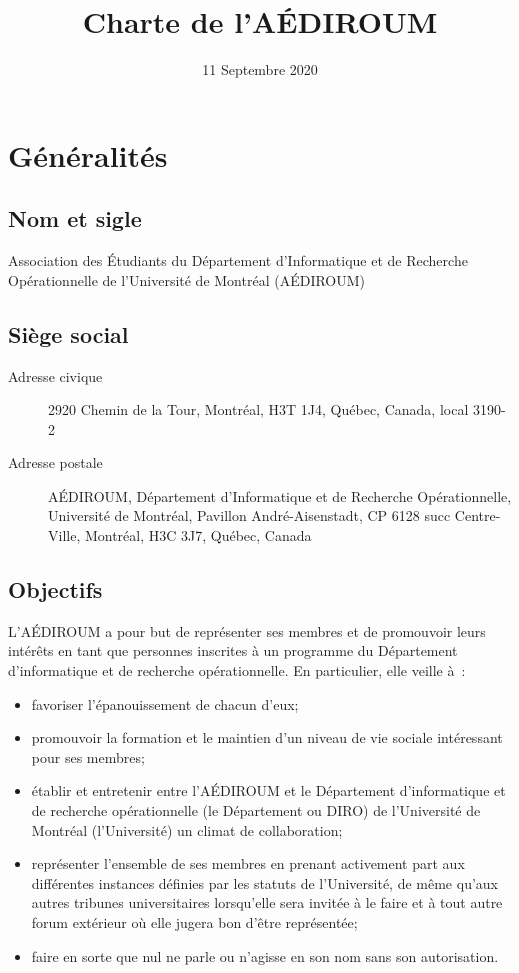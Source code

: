 \documentclass{aediroum}
\title{Charte de l'AÉDIROUM}
\date{11 Septembre 2020}
\begin{document}
\maketitle

\section{Généralités}\label{sec:generalites}

\subsection{Nom et sigle}\label{sec:nom-et-sigle}
Association des Étudiants du Département d'Informatique et de Recherche Opérationnelle de l'Université de Montréal (AÉDIROUM)

\subsection{Siège social}\label{sec:siege-social}
  \begin{description}
  \item[Adresse civique] 2920 Chemin de la Tour, Montréal, H3T 1J4, Québec, Canada, local 3190-2
  \item[Adresse postale] AÉDIROUM, Département d'Informatique et de Recherche Opérationnelle, Université de Montréal, Pavillon André-Aisenstadt, CP 6128 succ Centre-Ville, Montréal, H3C 3J7, Québec, Canada
  \end{description}

\subsection{Objectifs}\label{sec:objectifs}

L'AÉDIROUM a pour but de représenter ses membres et de promouvoir leurs intérêts en tant que personnes inscrites à un programme du Département d'informatique et de recherche opérationnelle. En particulier, elle veille à~:
\begin{itemize}
\item favoriser l'épanouissement de chacun d'eux;
\item promouvoir la formation et le maintien d'un niveau de vie sociale intéressant pour ses membres;
\item établir et entretenir entre l'AÉDIROUM et le Département d'informatique et de recherche opérationnelle (le Département ou DIRO) de l'Université de Montréal (l'Université) un climat de collaboration;
\item représenter l'ensemble de ses membres en prenant activement part aux différentes instances définies par les statuts de l'Université, de même qu'aux autres tribunes universitaires lorsqu'elle sera invitée à le faire et à tout autre forum extérieur où elle jugera bon d'être représentée;
\item faire en sorte que nul ne parle ou n'agisse en son nom sans son autorisation.
\end{itemize}
\end{document}

